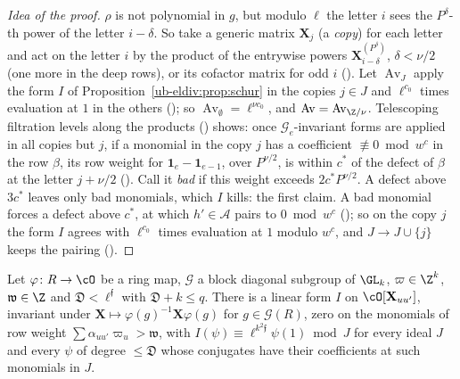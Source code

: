 \begin{proof}[Idea of the proof]
$\rho$ is not polynomial in $g$, but modulo $\ell$ the letter $i$ sees the $P^\delta$-th power of the
letter $i-\delta$. So take a generic matrix $\mathbf X_j$ (a \emph{copy}) for each letter and act on
the letter $i$ by the product of the entrywise powers $\mathbf X_{i-\delta}^{(P^\delta)}$,
$\delta<\nu/2$ (one more in the deep rows), or its cofactor matrix for odd $i$
(). Let $\operatorname{Av}_J$ apply the form $I$ of
Proposition~\ref{ub-eldiv:prop:schur} in the copies $j\in J$ and $\ell^{c_0}$ times evaluation at $1$
in the others (); so $\operatorname{Av}_\emptyset=\ell^{\nu
c_0}$, and $\operatorname{Av}=\operatorname{Av}_{\Z/\nu}$. Telescoping filtration levels along the
products () shows: once $\mathcal
G_e$-invariant forms are applied in all copies but $j$, if a monomial in the copy $j$ has a
coefficient $\not\equiv0\bmod w^c$ in the row $\beta$, its row weight for $\mathbf 1_e-\mathbf
1_{e-1}$, over $P^{\nu/2}$, is within $c^*$ of the defect of $\beta$ at the letter $j+\nu/2$
().
Call it \emph{bad} if this weight exceeds $2c^*P^{\nu/2}$. A defect above $3c^*$ leaves only bad
monomials, which $I$ kills: the first claim. A bad monomial forces a defect above $c^*$, at which
$h'\in\mathcal A$ pairs to $0\bmod w^c$ ();
so on the copy $j$ the form $I$ agrees with $\ell^{c_0}$ times evaluation at $1$ modulo $w^c$, and
$J\to J\cup\{j\}$ keeps the pairing ().
\end{proof}

\begin{proposition}\label{ub-eldiv:prop:schur}
Let $\varphi\colon R\to\cO$ be a ring map, $\mathcal G$ a block diagonal subgroup of $\GL_k$,
$\varpi\in\Z^k$, $\mathfrak w\in\Z$ and $\mathfrak D<\ell^{\mathfrak f}$ with $\mathfrak D+k\le q$. There is a linear form $I$
on $\cO[\mathbf X_{uu'}]$, invariant under $\mathbf X\mapsto\varphi(g)^{-1}\mathbf X\varphi(g)$ for
$g\in\mathcal G(R)$, zero on the monomials of row weight $\sum\alpha_{uu'}\varpi_u>\mathfrak w$, with
$I(\psi)\equiv \ell^{k^2\mathfrak f}\psi(1)\bmod J$ for every ideal $J$ and every $\psi$ of degree $\le \mathfrak D$
whose conjugates have their coefficients at such monomials in $J$.
\end{proposition}

